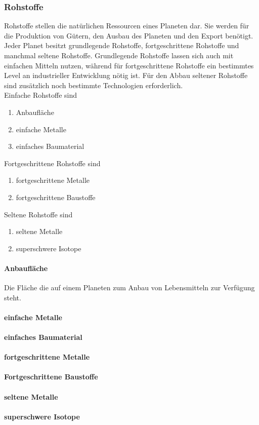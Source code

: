 \documentclass[11pt, a4paper]{article}
\begin{document}
\subsubsection{Rohstoffe}
Rohstoffe stellen die natürlichen Ressourcen eines Planeten dar. Sie werden für die Produktion von Gütern, 
den Ausbau des Planeten und den Export benötigt. Jeder Planet besitzt grundlegende Rohstoffe, fortgeschrittene
Rohstoffe und manchmal seltene Rohstoffe. Grundlegende Rohstoffe lassen sich auch mit einfachen Mitteln
nutzen, während für fortgeschrittene Rohstoffe ein bestimmtes Level an industrieller Entwicklung nötig ist.
Für den Abbau seltener Rohstoffe sind zusätzlich noch bestimmte Technologien erforderlich.
\\
Einfache Rohstoffe sind 
\begin{enumerate}
    \item Anbaufläche
    \item einfache Metalle
    \item einfaches Baumaterial
\end{enumerate}
%
Fortgeschrittene Rohstoffe sind
\begin{enumerate}
    \item fortgeschrittene Metalle
    \item fortgeschrittene Baustoffe
\end{enumerate}
%
Seltene Rohstoffe sind
\begin{enumerate}
    \item seltene Metalle
    \item superschwere Isotope
\end{enumerate}
%
\paragraph{Anbaufläche}
Die Fläche die auf einem Planeten zum Anbau von Lebensmitteln zur Verfügung steht.
%
\paragraph{einfache Metalle}
%
\paragraph{einfaches Baumaterial}
%
\paragraph{fortgeschrittene Metalle}
%
\paragraph{Fortgeschrittene Baustoffe}
%
\paragraph{seltene Metalle}
%
\paragraph{superschwere Isotope}
%
\end{document}
